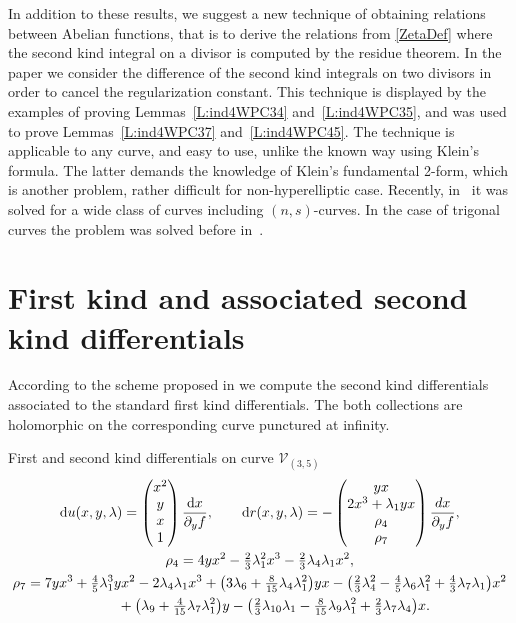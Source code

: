 \documentclass[pdftex]{sigma}
\numberwithin{equation}{section}
\newcommand{\rmd}{\mathrm{d}}
\begin{document}
 In addition to these results, we suggest a new technique of obtaining relations between Abelian functions, that is to derive the relations from \eqref{ZetaDef} where the second kind integral on a divisor is computed by the residue theorem. In the paper we consider the difference of the second kind integrals on two divisors in order to cancel the regularization constant. This technique is displayed by the examples of proving Lemmas~\ref{L:ind4WPC34} and~\ref{L:ind4WPC35}, and was used to prove Lemmas~\ref{L:ind4WPC37} and~\ref{L:ind4WPC45}. The technique is applicable to any curve, and easy to use, unlike the known way using Klein's formula. The latter demands the knowledge of Klein's fundamental 2-form, which is another problem, rather difficult for non-hyperelliptic case. Recently, in~\cite{Suz2017} it was solved for a wide class of curves including $(n,s)$-curves. In the case of trigonal curves the problem was solved before in~\cite{BEL2000}.

\appendix

\section{First kind and associated second kind differentials}\label{A:Diffs}
According to the scheme proposed in \cite{BL2008} we compute the second kind differentials associated to the standard first kind differentials. The both collections are holomorphic on the corresponding curve punctured at infinity.

First and second kind differentials on curve $\mathcal{V}_{(3,5)}$
\begin{gather}
 \rmd u(x,y,\lambda) =\begin{pmatrix}
 x^2 \\ y \\x \\ 1
 \end{pmatrix} \frac{\rmd x}{\partial_y f}, \qquad
 \rmd r(x,y,\lambda) = - \begin{pmatrix}
 y x \\ 2 x^3 + \lambda_1 y x \\ \rho_4 \\ \rho_7
 \end{pmatrix}\frac{dx}{\partial_y f}, \label{Diffs35} \\
 \rho_4 = 4 y x^2 - \tfrac{2}{3} \lambda_1^2 x^3 - \tfrac{2}{3} \lambda_4 \lambda_1 x^2, \nonumber\\
 \rho_7 = 7 y x^3 + \tfrac{4}{5} \lambda_1^3 y x^2 - 2\lambda_4 \lambda_1 x^3 + \big(3\lambda_6 + \tfrac{8}{15}\lambda_4\lambda_1^2\big) y x - \big(\tfrac{2}{3}\lambda_4^2 -\tfrac{4}{5}\lambda_6\lambda_1^2
 + \tfrac{4}{3}\lambda_7\lambda_1\big)x^2 \nonumber\\
 \hphantom{\rho_7 =}{} + \big(\lambda_9+\tfrac{4}{15}\lambda_7\lambda_1^2\big)y - \big(\tfrac{2}{3}\lambda_{10}\lambda_1-\tfrac{8}{15}\lambda_9\lambda_1^2 +\tfrac{2}{3}\lambda_7\lambda_4\big)x. \notag
\end{gather}
\end{document}
